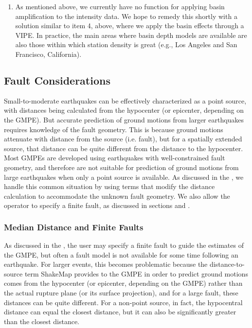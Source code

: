 \documentclass[letterpaper,10pt,english]{sphinxmanual}
\begin{document}
\begin{enumerate}
\item {} 
As mentioned above, we currently have no function for applying basin
amplification to the intensity data. We hope to remedy this shortly with a solution
similar to item 4, above, where we apply the basin effects through a
VIPE. In practice, the main areas where basin depth models are
available are also those within which station density is great
(e.g., Los Angeles and San Francisco, California).

\end{enumerate}


\subsection{Fault Considerations}
\label{tg_processing:fault-considerations}
Small-to-moderate earthquakes can be effectively characterized as a point source, with
distances being calculated from the hypocenter (or epicenter, depending on the GMPE).
But accurate prediction of ground motions from larger earthquakes requires knowledge of
the fault geometry. This is because ground motions attenuate with
distance from the source (i.e. fault), but for a spatially extended source, that distance can be quite different
from the distance to the hypocenter. Most GMPEs are developed using earthquakes with
well-constrained fault geometry, and therefore are not suitable for prediction of ground
motions from large earthquakes when only a point source is available. As discussed in the
{\hyperref[tg_processing:sec\string-median\string-distance]{}}, we handle this common situation by using terms that modify the
distance calculation to accommodate the unknown fault geometry. We also allow the
operator to specify a finite fault, as discussed in sections {\hyperref[tg_processing:sec\string-fault\string-dimensions]{}}
and {\hyperref[tg_processing:sec\string-directivity]{}}.


\subsubsection{Median Distance and Finite Faults}
\label{tg_processing:sec-median-distance}\label{tg_processing:median-distance-and-finite-faults}
As discussed in the {\hyperref[software_guide:sm35\string-software\string-guide]{}}, the user may specify a
finite fault to guide the
estimates of the GMPE, but often a fault model is not available for some time following
an earthquake. For larger events, this becomes problematic because the
distance-to-source
term ShakeMap provides to the GMPE in order to predict ground motions comes
from the hypocenter (or epicenter, depending on the GMPE) rather than the actual rupture
plane (or its surface projection), and for a large fault, these distances can be quite
different. For a non-point source, in fact, the hypocentral distance
can equal the closest distance, but it can also be significantly greater than the
closest distance.
\end{document}
